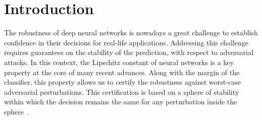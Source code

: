\documentclass{article} \usepackage{iclr2023_conference,times}
\newcommand{\0}{\mathbf{0} }
\begin{document}
\section{Introduction}
The robustness of deep neural networks is nowadays a great challenge to establish confidence in their  decisions for real-life applications.  Addressing this challenge requires guarantees on the stability of the prediction, with respect to adversarial attacks. In this context, the Lipschitz constant of neural networks is a key property at the core of many recent advances. Along with the margin of the classifier, this property allows us to certify the robustness against worst-case adversarial perturbations.  This certification is based on a sphere of stability within which the decision remains the same for any perturbation inside the sphere~\citep{tsuzuku2018lipschitz}.
\end{document}
